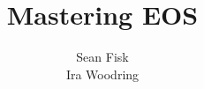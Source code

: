 \documentclass{beamer}
\title{Mastering EOS}
\author[Fisk \& Woodring]{
  Sean Fisk\dotfill\mailtohref{fiskse@mail.gvsu.edu} \\
  Ira Woodring\dotfill\mailtohref{woodriir@gvsu.edu}}
\begin{document}
\begin{frame}[fragile]{}
  \begin{columns}[T]
    \begin{column}{0.33\textwidth}
      
      
      
      
    \end{column}
    \begin{column}{0.33\textwidth}
      
      
      
      
    \end{column}
    \begin{column}{0.33\textwidth}
      
      
      
      
      
    \end{column}
  \end{columns}
\end{frame}
\end{document}
